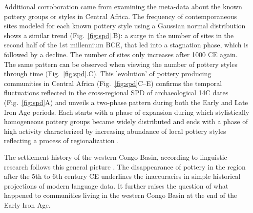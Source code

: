 \documentclass[smallextended,natbib]{svjour3}       %
\begin{document}
Additional corroboration came from examining the meta-data about the known pottery groups or styles in Central Africa. The frequency of contemporaneous sites modeled for each known pottery style using a Gaussian normal distribution \citet{Roberts.2012} shows a similar trend (Fig.~\ref{fig:spd}.B): a surge in the number of sites in the second half of the 1st millennium BCE, that led into a stagnation phase, which is followed by a decline. The number of sites only increases after 1000 CE again. The same pattern can be observed when viewing the number of pottery styles through time (Fig.~\ref{fig:spd}.C). This 'evolution' of pottery producing communities in Central Africa (Fig.~\ref{fig:spd}C--E) confirms the temporal fluctuations reflected in the cross-regional SPD of archaeological 14C dates (Fig.~\ref{fig:spd}A) and unveils a two-phase pattern during both the Early and Late Iron Age periods. Each starts with a phase of expansion during which stylistically homogeneous pottery groups became widely distributed and ends with a phase of high activity characterized by increasing abundance of local pottery styles reflecting a process of regionalization \citep{Seidensticker.2021}. 

The settlement history of the western Congo Basin, according to linguistic research \citep{Grollemund.2015,Bostoen.2015,Koile.2022} follows this general picture \citep{Seidensticker.2016b,Seidensticker.2021e,Seidensticker.Submitted}. The disappearance of pottery in the region after the 5th to 6th century CE underlines the inaccuracies in simple historical projections of modern language data. It further raises the question of what happened to communities living in the western Congo Basin at the end of the Early Iron Age.
\end{document}
